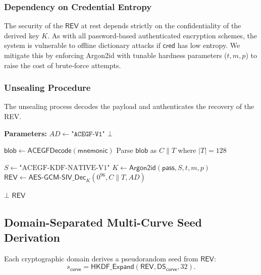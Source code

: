 \documentclass[12pt,a4paper]{article}
\begin{document}
  \subsubsection*{Dependency on Credential Entropy}
  The security of the $\mathsf{REV}$ at rest depends strictly on the confidentiality of the derived key $K$. As with all password-based authenticated encryption schemes, the system is vulnerable to offline dictionary attacks if $\mathsf{cred}$ has low entropy. We mitigate this by enforcing Argon2id with tunable hardness parameters ($t, m, p$) to raise the cost of brute-force attempts.

  \subsubsection{Unsealing Procedure}

  The unsealing process decodes the payload and authenticates the recovery of the REV.

  \begin{algorithm}[H]
   \caption{Unseal($\mathsf{mnemonic}, \mathsf{pass}$)}
   \begin{algorithmic}[1]
  \State \textbf{Parameters:}
  \State \quad $AD \gets \texttt{"ACEGF-V1"}$ 
   \Return $\bot$ \EndIf

  \State $\mathsf{blob} \gets \mathsf{ACEGFDecode}(\mathsf{mnemonic})$
  \State Parse $\mathsf{blob}$ as $C \parallel T$ where $|T|=128$

  \State $S \gets \text{"ACEGF-KDF-NATIVE-V1"}$
  \State $K \gets \mathsf{Argon2id}(\mathsf{pass}, S, t, m, p)$
  \State $\mathsf{REV} \gets \mathsf{AES\text{-}GCM\text{-}SIV\_Dec}_{K}(0^{96}, C \parallel T, AD)$

   \Return $\bot$ \EndIf
  \State \Return $\mathsf{REV}$ 
   \end{algorithmic}
  \end{algorithm}

  \subsection{Domain-Separated Multi-Curve Seed Derivation}

  Each cryptographic domain derives a pseudorandom seed from $\mathsf{REV}$:
  \[
   s_{\mathsf{curve}} =
   \mathsf{HKDF\_Expand}(\mathsf{REV}, \mathsf{DS}_{\mathsf{curve}}, 32).
  \]
\end{document}
